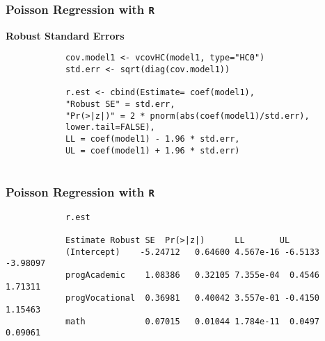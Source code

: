 \documentclass[00-GLMregslides.tex]{subfiles}
\begin{document}
	\begin{frame}[fragile]
		
		\frametitle{Poisson Regression with \texttt{R}}
		\large
		\textbf{Robust Standard Errors}
		\begin{framed}
			\begin{verbatim}
			cov.model1 <- vcovHC(model1, type="HC0")
			std.err <- sqrt(diag(cov.model1))
			
			r.est <- cbind(Estimate= coef(model1), 
			"Robust SE" = std.err,
			"Pr(>|z|)" = 2 * pnorm(abs(coef(model1)/std.err), 
			lower.tail=FALSE),
			LL = coef(model1) - 1.96 * std.err,
			UL = coef(model1) + 1.96 * std.err)
			
			\end{verbatim}
		\end{framed}
	\end{frame}
	
	\begin{frame}[fragile]
		
		\frametitle{Poisson Regression with \texttt{R}}
		\large 
		
			\begin{verbatim}
			r.est
			
			Estimate Robust SE  Pr(>|z|)      LL       UL
			(Intercept)    -5.24712   0.64600 4.567e-16 -6.5133 -3.98097
			progAcademic    1.08386   0.32105 7.355e-04  0.4546  1.71311
			progVocational  0.36981   0.40042 3.557e-01 -0.4150  1.15463
			math            0.07015   0.01044 1.784e-11  0.0497  0.09061
			\end{verbatim}
	
		
	\end{frame}
	
\end{document}
